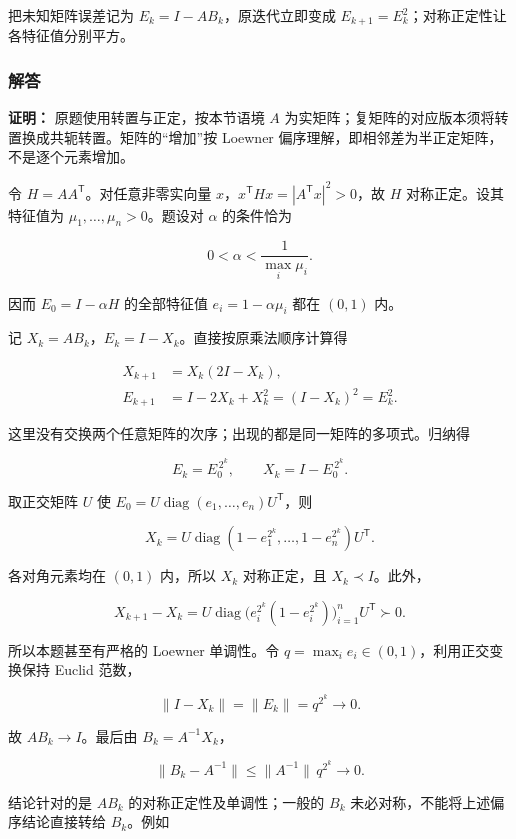 \documentclass[11pt,a4paper]{article}
\begin{document}
把未知矩阵误差记为 \(E_k=I-AB_k\)，原迭代立即变成
\(E_{k+1}=E_k^2\)；对称正定性让各特征值分别平方。

\subsubsection{解答}\label{ux89e3ux7b54-16}

\textbf{证明：} 原题使用转置与正定，按本节语境 \(A\)
为实矩阵；复矩阵的对应版本须将转置换成共轭转置。矩阵的``增加''按 Loewner
偏序理解，即相邻差为半正定矩阵，不是逐个元素增加。

令 \(H=AA^{\mathsf T}\)。对任意非零实向量
\(x\)，\(x^{\mathsf T}Hx=|A^{\mathsf T}x|^2>0\)，故 \(H\)
对称正定。设其特征值为 \(\mu_1,\ldots,\mu_n>0\)。题设对 \(\alpha\)
的条件恰为

\[
0<\alpha<\frac1{\max_i\mu_i}.
\]

因而 \(E_0=I-\alpha H\) 的全部特征值 \(e_i=1-\alpha\mu_i\) 都在
\((0,1)\) 内。

记 \(X_k=AB_k\)，\(E_k=I-X_k\)。直接按原乘法顺序计算得

\[
\begin{aligned}
X_{k+1}&=X_k(2I-X_k),\\
E_{k+1}&=I-2X_k+X_k^2=(I-X_k)^2=E_k^2.
\end{aligned}
\]

这里没有交换两个任意矩阵的次序；出现的都是同一矩阵的多项式。归纳得

\[
E_k=E_0^{\,2^k},
\qquad X_k=I-E_0^{\,2^k}.
\]

取正交矩阵 \(U\) 使
\(E_0=U\operatorname{diag}(e_1,\ldots,e_n)U^{\mathsf T}\)，则

\[
X_k=U\operatorname{diag}(1-e_1^{2^k},\ldots,1-e_n^{2^k})U^{\mathsf T}.
\]

各对角元素均在 \((0,1)\) 内，所以 \(X_k\) 对称正定，且
\(X_k\prec I\)。此外，

\[
X_{k+1}-X_k
=U\operatorname{diag}\bigl(e_i^{2^k}(1-e_i^{2^k})\bigr)_{i=1}^{n}U^{\mathsf T}
\succ0.
\]

所以本题甚至有严格的 Loewner 单调性。令
\(q=\max_i e_i\in(0,1)\)，利用正交变换保持 Euclid 范数，

\[
\|I-X_k\|=\|E_k\|=q^{2^k}\longrightarrow0.
\]

故 \(AB_k\to I\)。最后由 \(B_k=A^{-1}X_k\)，

\[
\|B_k-A^{-1}\|
\le\|A^{-1}\|\,q^{2^k}\longrightarrow0.
\]

结论针对的是 \(AB_k\) 的对称正定性及单调性；一般的 \(B_k\)
未必对称，不能将上述偏序结论直接转给 \(B_k\)。例如
\end{document}
